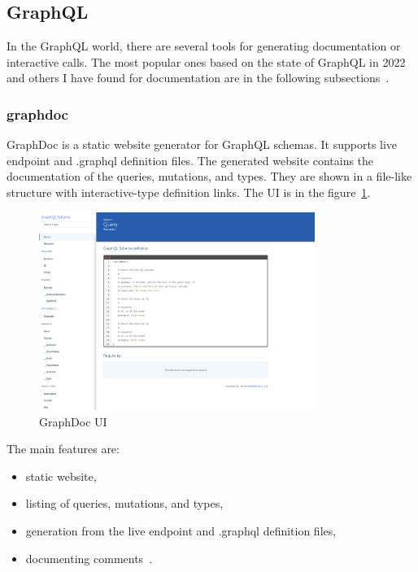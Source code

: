 
\subsection{GraphQL}
In the GraphQL world, there are several tools for generating documentation or interactive calls.
The most popular ones based on the state of GraphQL in 2022 and others I have found for documentation are in the following subsections~\cite{graphql-popularity}.

\subsubsection{graphdoc}
GraphDoc is a static website generator for GraphQL schemas.
It supports live endpoint and .graphql definition files.
The generated website contains the documentation of the queries, mutations, and types.
They are shown in a file-like structure with interactive-type definition links.
The UI is in the figure~\ref{fig:graphql-graphdoc}.
\cite{graphql-graphdoc}

\begin{figure}[hbt!]
    \centering
    \captionsetup{justification=centering}
    \includegraphics[width=0.8\textwidth]{images/graphql/graphdoc}
    \caption{GraphDoc UI~\cite{graphql-graphdoc}}
    \label{fig:graphql-graphdoc}
\end{figure}

The main features are:
\begin{itemize}
    \item static website,
    \item listing of queries, mutations, and types,
    \item generation from the live endpoint and .graphql definition files,
    \item documenting comments~\cite{graphql-graphdoc}.
\end{itemize}

